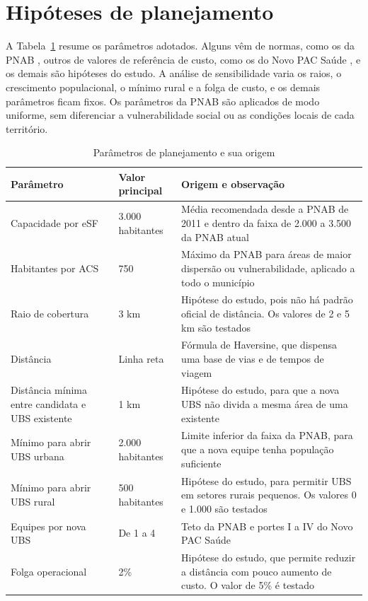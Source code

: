 \section{Hipóteses de planejamento}
A Tabela~\ref{tab:hipoteses} resume os parâmetros adotados. Alguns vêm de normas, como os da PNAB
\citep{pnab2017}, outros de valores de referência de custo, como os do Novo PAC Saúde
\citep{novopac2025}, e os demais são hipóteses do estudo. A análise de sensibilidade varia os raios, o crescimento populacional, o mínimo rural e a folga de custo, e os demais parâmetros ficam fixos. Os
parâmetros da PNAB são aplicados de modo uniforme, sem diferenciar a vulnerabilidade social ou as
condições locais de cada território.

\begin{table}[htbp]\centering
\caption{Parâmetros de planejamento e sua origem}\label{tab:hipoteses}
\begin{tabular}{p{.26\linewidth}p{.19\linewidth}p{.44\linewidth}}
\toprule Parâmetro & Valor principal & Origem e observação\\\midrule
Capacidade por eSF & 3.000 habitantes & Média recomendada desde a PNAB de 2011 e dentro da faixa de 2.000 a 3.500 da PNAB atual \citep{brasil2013teto,pnab2017}\\
Habitantes por ACS & 750 & Máximo da PNAB para áreas de maior dispersão ou vulnerabilidade, aplicado a todo o município\\
Raio de cobertura & 3 km & Hipótese do estudo, pois não há padrão oficial de distância. Os valores de 2 e 5 km são testados\\
Distância & Linha reta & Fórmula de Haversine, que dispensa uma base de vias e de tempos de viagem\\
Distância mínima entre candidata e UBS existente & 1 km & Hipótese do estudo, para que a nova UBS não divida a mesma área de uma existente\\
Mínimo para abrir UBS urbana & 2.000 habitantes & Limite inferior da faixa da PNAB, para que a nova equipe tenha população suficiente\\
Mínimo para abrir UBS rural & 500 habitantes & Hipótese do estudo, para permitir UBS em setores rurais pequenos. Os valores 0 e 1.000 são testados\\
Equipes por nova UBS & De 1 a 4 & Teto da PNAB e portes I a IV do Novo PAC Saúde\\
Folga operacional & 2\% & Hipótese do estudo, que permite reduzir a distância com pouco aumento de custo. O valor de 5\% é testado\\

\end{tabular}
\end{table}
